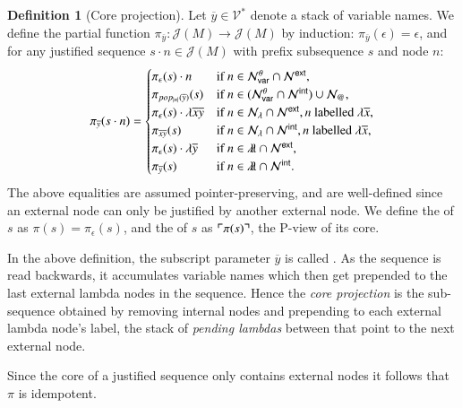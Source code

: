 \documentclass{elsarticle}
\makeatletter
\theoremstyle{plain}
\theoremstyle{definition}
\newtheorem{definition}{Definition}[section]
\theoremstyle{remark}
\newcommand\VarSet{\mathcal{V}}
\newcommand\Nodes{\mathcal{N}}%
\newcommand\NodesVar{\Nodes_{\sf var}}%
\newcommand\NodesLmd{\Nodes_\lambda}%
\newcommand\NodesApp{\Nodes_@}%
\newcommand{\ghostlmd}{{\lambda\!\!\lambda}}
\newcommand{\ghostvar}{\theta}
\newcommand\ExtendedNodesVar{\NodesVar^\ghostvar}
\def\coresymbol{\pi} %
\newcommand{\core}[1]{\coresymbol(#1)} %
\newcommand{\ExternalNodes}{\Nodes^{\sf ext}}
\newcommand{\InternalNodes}{\Nodes^{\sf int}}
\def\justseqset{\mathcal{J}}
\makeatother
\begin{document}
\begin{definition}[Core projection]
\label{def:coreprojection}
Let $\overline{y} \in \VarSet^*$ denote a stack of variable names.
We define the partial function $\coresymbol_{\overline{y}}\colon \justseqset(M) \longrightarrow \justseqset(M)$ by induction: $\coresymbol_{\overline{y}}(\epsilon) = \epsilon$, and for any justified sequence $s \cdot n\in\justseqset(M)$ with prefix subsequence $s$ and node $n$:
\begin{equation*}
\coresymbol_{\overline{y}}(s\cdot n) =
\begin{cases}
\coresymbol_{\epsilon}(s) \cdot n
    & \mbox{if } n\in\ExtendedNodesVar\inter\ExternalNodes, \\
\coresymbol_{pop_{|n|}(\overline{y})}(s)
    & \mbox{if } n\in(\ExtendedNodesVar\inter\InternalNodes)\union\NodesApp, \\
\coresymbol_{\epsilon}(s) \cdot \lambda \overline{x}\overline{y}
    & \mbox{if } n\in\NodesLmd\inter\ExternalNodes, n \mbox{ labelled } \lambda\overline{x},\\
\coresymbol_{\overline{x} \overline{y}}(s)
    & \mbox{if } n\in\NodesLmd\inter\InternalNodes, n \mbox{ labelled } \lambda\overline{x}, \\
\coresymbol_{\epsilon}(s) \cdot\lambda\overline{y}
    & \mbox{if } n\in\ghostlmd\inter\ExternalNodes, \\
\coresymbol_{\overline{y}}(s)
    & \mbox{if } n\in\ghostlmd\inter\InternalNodes.
\end{cases}
\end{equation*}
The above equalities are assumed pointer-preserving, and are well-defined since an external node can only be justified by another external node. We define
the  of $s$ as $\core{s} = \coresymbol_\epsilon(s)$,
and the  of $s$ as $\pview{\core{s}}$, the P-view of its core.
\end{definition}

In the above definition, the subscript parameter $\overline{y}$ is called . As the sequence is read backwards, it accumulates variable names which then get prepended to the last external lambda nodes in the sequence. Hence the \emph{core projection} is the sub-sequence obtained by removing internal nodes and prepending to each external lambda node's label, the stack of \emph{pending lambdas} between that point to the next external node.

Since the core of a justified sequence only contains external nodes it follows that $\coresymbol$ is idempotent.
\end{document}
